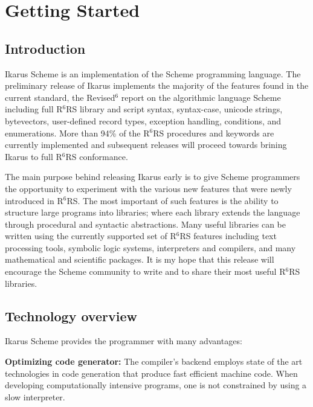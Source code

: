 \documentclass[onecolumn, 12pt, twoside, openright, dvipdfm]{book}
\newcommand{\rnrs}[1]{R$^{\mathrm{#1}}$RS}
\begin{document}
\newpage

\pagestyle{fancy}
{}
\tableofcontents

\newpage

\mainmatter
\setlength{\parindent}{0pt} 
\setlength{\parskip}{2.0ex plus 0ex minus 0ex}
\chapter{Getting Started}
\section{Introduction}

Ikarus Scheme is an implementation of the Scheme programming
language.  The preliminary release of Ikarus implements the majority
of the features found in the current standard, the
Revised$^\mathrm{6}$ report on the algorithmic language
Scheme\cite{r6rs} including full \rnrs{6} library and script syntax,
syntax-case, unicode strings, bytevectors, user-defined record
types, exception handling, conditions, and enumerations.  More than
94\% of the \rnrs{6} procedures and keywords are currently
implemented and subsequent releases will proceed towards brining
Ikarus to full \rnrs{6} conformance.

The main purpose behind releasing Ikarus early is to give Scheme
programmers the opportunity to experiment with the various new
features that were newly introduced in \rnrs{6}.  The most important
of such features is the ability to structure large programs into
libraries; where each library extends the language through
procedural and syntactic abstractions.  Many useful libraries can be
written using the currently supported set of \rnrs{6} features
including text processing tools, symbolic logic systems,
interpreters and compilers, and many mathematical and scientific
packages.  It is my hope that this release will encourage the
Scheme community to write and to share their most useful \rnrs{6}
libraries.


\newpage

\section{Technology overview}

Ikarus Scheme provides the programmer with many advantages:

\textbf{Optimizing code generator:}  The compiler's backend employs
state of the art technologies in code generation that produce fast
efficient machine code.  When developing computationally intensive
programs, one is not constrained by using a slow interpreter.
\end{document}
